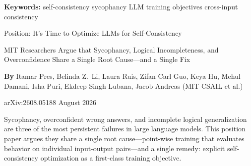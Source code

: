 \documentclass[10pt,twocolumn]{article}
\begin{document}
\setlength{\parindent}{0pt}
\setlength{\parskip}{4pt}

{\small\color{keywordgray}\textbf{Keywords:}
  self-consistency \textbullet{}
  sycophancy \textbullet{}
  LLM training objectives \textbullet{}
  cross-input consistency}\par\vspace{4pt}

{\LARGE\bfseries\raggedright
  Position: It's Time to Optimize LLMs
  for Self-Consistency}\par\vspace{4pt}

{\large\itshape\raggedright
  MIT Researchers Argue that Sycophancy, Logical Incompleteness,
  and Overconfidence Share a Single Root Cause---and a Single Fix}\par\vspace{6pt}

{\small\textbf{By} Itamar Pres, Belinda Z.~Li, Laura Ruis, Zifan Carl Guo,
  Keya Hu, Mehul Damani, Isha Puri, Ekdeep Singh Lubana,
  Jacob Andreas (MIT CSAIL et al.)}\par\vspace{2pt}

{\small\color{keywordgray}arXiv:2608.05188 \textbullet{} August 2026}
\par\vspace{2pt}\noindent{\color{rulered}\rule{\columnwidth}{0.6pt}}\vspace{6pt}

Sycophancy, overconfident wrong answers, and incomplete logical generalization are
three of the most persistent failures in large language models. This position paper
argues they share a single root cause---point-wise training that evaluates behavior
on individual input-output pairs---and a single remedy: explicit self-consistency
optimization as a first-class training objective.
\end{document}

